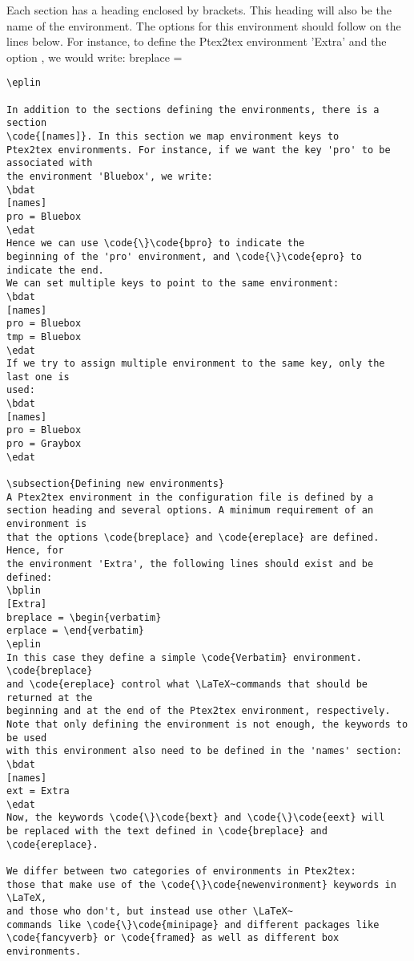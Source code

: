 \documentclass[a4paper,11pt]{article}
\begin{document}
{{{{{{{{{{{Each section has a heading enclosed by brackets. This heading will also be the
name of the environment. The options for this environment should follow on the
lines below. For instance, to define the Ptex2tex environment 'Extra'
and the option , we would write:
\bplin
[Extra]
breplace = \begin{Verbatim}
\eplin

In addition to the sections defining the environments, there is a section
\code{[names]}. In this section we map environment keys to
Ptex2tex environments. For instance, if we want the key 'pro' to be associated with
the environment 'Bluebox', we write:
\bdat
[names]
pro = Bluebox
\edat
Hence we can use \code{\}\code{bpro} to indicate the
beginning of the 'pro' environment, and \code{\}\code{epro} to indicate the end.
We can set multiple keys to point to the same environment:
\bdat
[names]
pro = Bluebox
tmp = Bluebox
\edat
If we try to assign multiple environment to the same key, only the last one is
used:
\bdat
[names]
pro = Bluebox
pro = Graybox
\edat

\subsection{Defining new environments}
A Ptex2tex environment in the configuration file is defined by a
section heading and several options. A minimum requirement of an environment is
that the options \code{breplace} and \code{ereplace} are defined. Hence, for
the environment 'Extra', the following lines should exist and be defined:
\bplin
[Extra]
breplace = \begin{verbatim} 
erplace = \end{verbatim}
\eplin
In this case they define a simple \code{Verbatim} environment. \code{breplace}
and \code{ereplace} control what \LaTeX~commands that should be returned at the
beginning and at the end of the Ptex2tex environment, respectively.
Note that only defining the environment is not enough, the keywords to be used
with this environment also need to be defined in the 'names' section:
\bdat
[names]
ext = Extra
\edat
Now, the keywords \code{\}\code{bext} and \code{\}\code{eext} will
be replaced with the text defined in \code{breplace} and \code{ereplace}.

We differ between two categories of environments in Ptex2tex: 
those that make use of the \code{\}\code{newenvironment} keywords in \LaTeX,
and those who don't, but instead use other \LaTeX~
commands like \code{\}\code{minipage} and different packages like
\code{fancyverb} or \code{framed} as well as different box environments. 


\end{Verbatim}}}}}}}}}}}}
\end{document}
